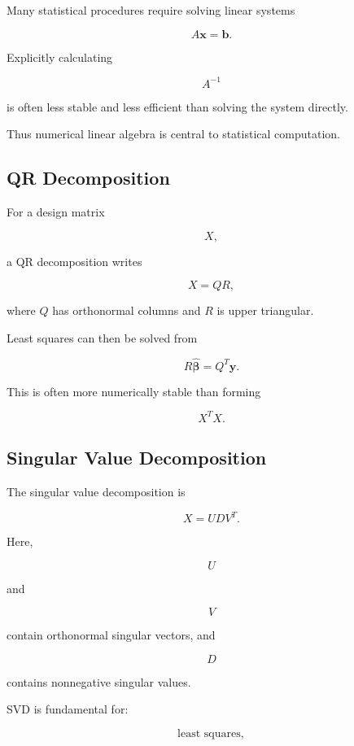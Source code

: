 Many statistical procedures require solving linear systems

\[
\boxed{
A\mathbf{x}
=
\mathbf{b}.
}
\]

Explicitly calculating

\[
A^{-1}
\]

is often less stable and less efficient than solving the system directly.

Thus numerical linear algebra is central to statistical computation.

\subsection{QR Decomposition}
\label{subsec:qr-statistics}

For a design matrix

\[
X,
\]

a QR decomposition writes

\[
\boxed{
X
=
QR,
}
\]

where \(Q\) has orthonormal columns and \(R\) is upper triangular.

Least squares can then be solved from

\[
\boxed{
R\widehat{\boldsymbol{\beta}}
=
Q^T\mathbf{y}.
}
\]

This is often more numerically stable than forming

\[
X^TX.
\]

\subsection{Singular Value Decomposition}
\label{subsec:svd-statistics}

The singular value decomposition is

\[
\boxed{
X
=
U
D
V^T.
}
\]

Here,

\[
U
\]

and

\[
V
\]

contain orthonormal singular vectors, and

\[
D
\]

contains nonnegative singular values.

SVD is fundamental for:

\[
\boxed{
\text{least squares},
}
\]

